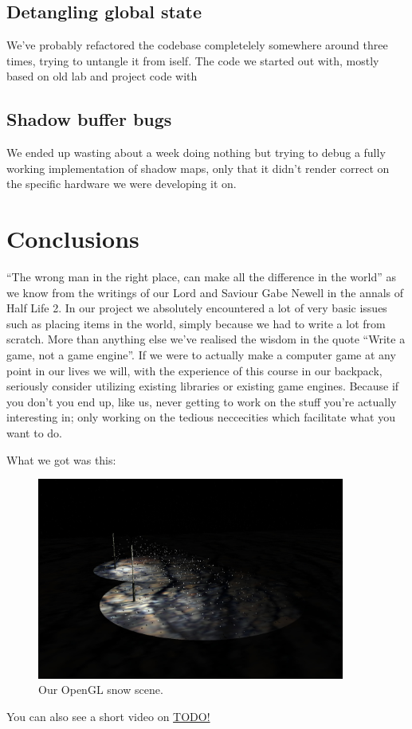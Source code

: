 \documentclass[a4paper,12pt]{article}
\begin{document}
\subsection{Detangling global state}

We've probably refactored the codebase completelely somewhere around three times, trying to untangle it from iself. The code we started out with, mostly based on old lab and project code with

\subsection{Shadow buffer bugs}

We ended up wasting about a week doing nothing but trying to debug a fully working implementation of shadow maps, only that it didn't render correct on the specific hardware we were developing it on.



\section{Conclusions}

``The wrong man in the right place, can make all the difference in the world'' as we know from the writings of our Lord and Saviour Gabe Newell in the annals of Half Life 2. In our project we absolutely encountered a lot of very basic issues such as placing items in the world, simply because we had to write a lot from scratch. More than anything else we've realised the wisdom in the quote ``Write a game, not a game engine''. If we were to actually make a computer game at any point in our lives we will, with the experience of this course in our backpack, seriously consider utilizing existing libraries or existing game engines. Because if you don't you end up, like us, never getting to work on the stuff you're actually interesting in; only working on the tedious neccecities which facilitate what you want to do.

What we got was this:

\begin{figure}[ht]
  \centering
  \includegraphics[width=0.9\textwidth]{result}
  \caption{\label{fig:label} Our OpenGL snow scene.}
\end{figure}

You can also see a short video on \href{YouTube}{TODO!}
\end{document}
